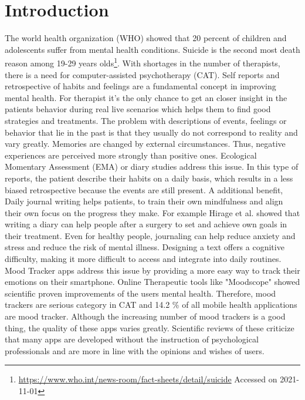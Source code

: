 \chapter{Introduction}
\label{ch:introduction}
The world health organization (WHO) showed that 20 percent of children and adolescents suffer from mental health conditions. 
Suicide is the second most death reason among 19-29 years olds\footnote{\url{https://www.who.int/news-room/fact-sheets/detail/suicide} Accessed on 2021-11-01}.
With shortages in the number of therapists, there is a need for computer-assisted psychotherapy (CAT). 
Self reports and retrospective of habits and feelings are a fundamental concept in improving mental health.
For therapist it's the only chance to get an closer insight in the patients behavior during real live scenarios which helps them to find good strategies and treatments.
The problem with descriptions of events, feelings or behavior that lie in the past is that they usually do not correspond to reality and vary greatly. 
Memories are changed by external circumstances. Thus, negative experiences are perceived more strongly than positive ones\cite{bradburn1987answering}.
Ecological Momentary Assessment (EMA) or diary studies address this issue\cite{shiffman2008ecological}.
In this type of reports, the patient describe their habits on a daily basis, which results in a less biased retrospective because the events are still present.
A additional benefit, Daily journal writing helps patients, to train their own mindfulness and align their own focus on the progress they make. For example Hirage et al. showed that writing a diary can help people after a surgery to set and achieve own goals in their treatment\cite{hiraga2019effects}.
Even for healthy people, journaling can help reduce anxiety and stress and reduce the risk of mental illness.
Designing a text offers a cognitive difficulty, making it more difficult to access and integrate into daily routines.
Mood Tracker apps address this issue by providing a more easy way to track their emotions on their smartphone. 
Online Therapeutic tools like "Moodscope" showed scientific proven improvements of the users mental health\cite{drake2013assessing}. Therefore, mood trackers are serious category in CAT and 14.2 \% of all mobile health applications are mood tracker.
Although the increasing number of mood trackers is a good thing, the quality of these apps varies greatly. 
Scientific reviews of these criticize that many apps are developed without the instruction of psychological professionals and are more in line with the opinions and wishes of users\cite{caldeira_mobile_nodate}\cite{schueller2021understanding}.
